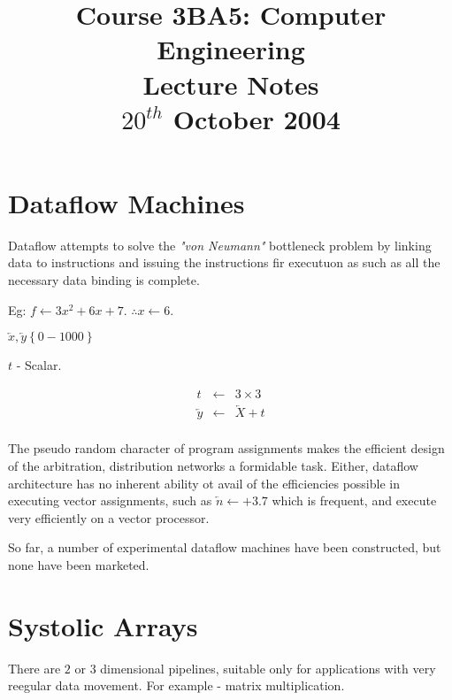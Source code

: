 \documentclass[a4paper,12pt]{article}
\begin{document}
\title{Course 3BA5: Computer Engineering \\ Lecture Notes \\ $20^{th}$ October 2004}

\maketitle

\section*{Dataflow Machines}

Dataflow attempts to solve the \emph{"von Neumann"} bottleneck problem
by linking data to instructions and issuing the instructions fir
executuon as such as all the necessary data binding is complete.

Eg: $f \leftarrow 3 x^{2} + 6 x + 7$. $\therefore x \leftarrow 6$.

\begin{table}[hbtp]


\end{table}

$\underleftarrow{x}, \underleftarrow{y} \left\{ 0 - 1000 \right\}$

$t$ - Scalar.

\begin{eqnarray*}
t						&	\leftarrow	&	3 \times 3				\\
\underleftarrow{y}	&	\leftarrow	&	\underleftarrow{X} + t	\\
\end{eqnarray*}

The pseudo random character of program assignments makes the efficient
design of the arbitration, distribution networks a formidable task.
Either, dataflow architecture has no inherent ability ot avail of the
efficiencies possible in executing vector assignments, such as
$\underleftarrow{n} \leftarrow + 3.7$ which is frequent, and execute very
efficiently on a vector processor.

So far, a number of experimental dataflow machines have been
constructed, but none have been marketed.

\section*{Systolic Arrays}

There are $2$ or $3$ dimensional pipelines, suitable only for
applications with very reegular data movement. For example - matrix
multiplication.

\begin{table}[hbtp]


\end{table}
\end{document}
